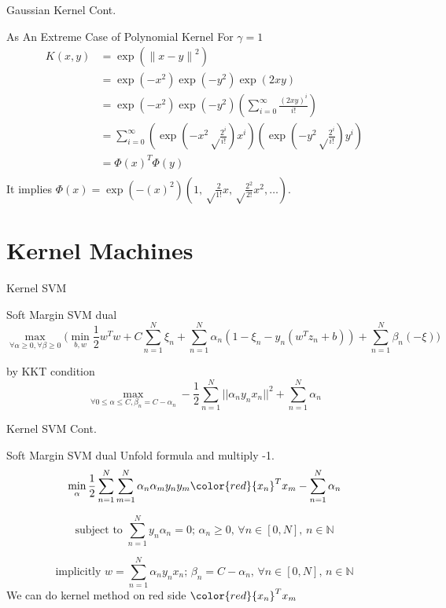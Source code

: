 \documentclass[10pt, compress]{beamer}
\begin{document}
\begin{frame}[fragile]{Gaussian Kernel Cont.}
  \begin{block}{As An Extreme Case of Polynomial Kernel}
    For \(\gamma = 1\)
    \begin{equation}
      \begin{split}
          K(x, y) &= \exp({\| x-y \|}^{2}) \\
                  &= \exp(-{x}^{2})\exp(-{y}^{2})\exp({2xy}) \\
                  &= \exp(-{x}^{2})\exp(-{y}^{2})(\sum_{i=0}^{\infty}\frac{{(2xy)}^{i}}{i!}) \\
                  &= \sum_{i=0}^{\infty}(\exp(-{x}^{2}\sqrt\frac{2^{i}}{i!}){x}^{i})(\exp(-{y}^{2}\sqrt\frac{2^{i}}{i!}){y}^{i}) \\
                  &= \Phi{(x)}^{T}\Phi(y)\\
      \end{split}
    \end{equation}
    It implies \(\Phi(x) = \exp(-{(x)}^{2})(1, \sqrt\frac{2}{1!}x, \sqrt\frac{2^{2}}{2!}x^{2}, \dots)\).
  \end{block}
\end{frame}

\section{Kernel Machines}

\begin{frame}[fragile]{Kernel SVM}
  \begin{block}{Soft Margin SVM dual}
    \[
      \max_{\forall \alpha \geq 0, \forall \beta \geq 0}\big(\min_{b, w} \frac{1}{2}{w}^{T}w + C\sum_{n=1}^{N}{\xi}_{n} + \sum_{n=1}^{N} {\alpha}_{n}(1-{\xi}_{n}-{y}_{n}({w}^{T}{z}_{n} + b)) + \sum_{n=1}^{N}{\beta}_{n}(-\xi)\big)
    \]
    
    by KKT condition
    \[
      \max_{\forall 0 \leq \alpha \leq C, {\beta}_{n} = C-\alpha_{n}} -\frac{1}{2}\sum_{n=1}^{N}{||{\alpha}_{n}y_{n}x_{n}||}^{2} + \sum_{n=1}^{N}{\alpha}_{n}
    \]
  \end{block}
\end{frame}

\begin{frame}[fragile]{Kernel SVM Cont.}
  \begin{block}{Soft Margin SVM dual}
    Unfold formula and multiply -1.
    \[
      \min_{\alpha} \frac{1}{2}\sum_{n=1}^{N}\sum_{m=1}^{N}{\alpha}_{n}{\alpha}_{m}y_{n}y_{m}{\color{red}{x_{n}}^{T}x_{m}} - \sum_{n=1}^{N}{\alpha}_{n}
    \]
    
    \[
      \text{subject to  } \sum_{n=1}^{N}y_n{\alpha}_{n} = 0 \text{; } {\alpha}_{n} \geq 0 \text{, } \forall n \in [0,N] \text{, } n \in \mathbb{N}
    \]

    \[
      \text{implicitly  } w =\sum_{n=1}^{N}{\alpha}_{n}y_{n}x_{n} \text{; } {\beta}_{n} = C - \alpha_{n} \text{, } \forall n \in [0,N] \text{, } n \in \mathbb{N}
    \]
    We can do kernel method on red side \({\color{red}{x_{n}}^{T}x_{m}}\)
 
  \end{block}
\end{frame}
\end{document}
